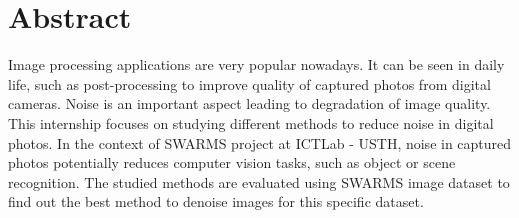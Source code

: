 \chapter*{Abstract}

Image processing applications are very popular nowadays. It can be seen in daily life, such as post-processing to improve quality of captured photos from digital cameras. Noise is an important aspect leading to degradation of image quality. This internship focuses on studying different methods to reduce noise in digital photos. In the context of SWARMS project at ICTLab - USTH, noise in captured photos potentially reduces computer vision tasks, such as object or scene recognition. The studied  methods are evaluated using SWARMS image dataset to find out the best method to denoise images for this specific dataset.
